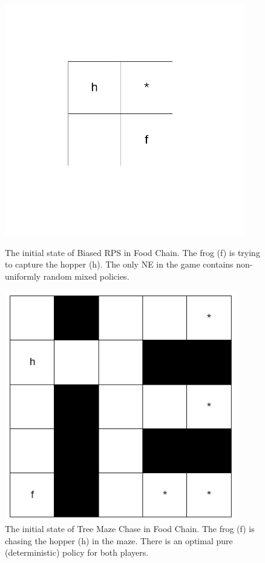 \documentclass[]{interact}
\theoremstyle{plain}%
\theoremstyle{definition}
\theoremstyle{remark}
\begin{document}
\begin{figure}
\centering
    \begin{minipage}{0.48\textwidth}
        \centering
        \includegraphics[width=0.931\textwidth]{images/biased_rps.png}
        \caption{The initial state of Biased RPS in Food Chain. The frog (f) is trying to capture the hopper (h). The only NE in the game contains non-uniformly random mixed policies.}
        \label{fig:biased_rps_in_food_chain}
    \end{minipage}\hfill
    \begin{minipage}{0.48\textwidth}
        \centering
        \includegraphics[width=0.9\textwidth]{images/tree_maze_chase.png}
        \caption{The initial state of Tree Maze Chase in Food Chain. The frog (f) is chasing the hopper (h) in the maze. There is an optimal pure (deterministic) policy for both players.}
        \label{fig:tree_maze_chase}
    \end{minipage}
\end{figure}
\end{document}
